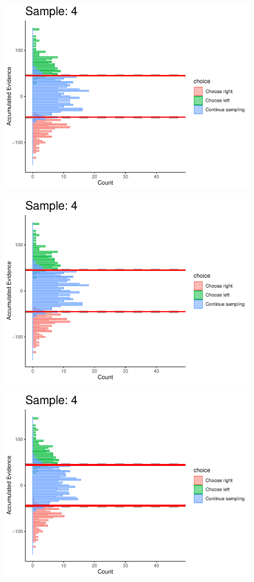 \documentclass[
]{book}
\begin{document}
\begin{center}\includegraphics[width=0.8\linewidth]{LateNightBayes_files/figure-latex/collapsing_dcb-35} \end{center}

\begin{center}\includegraphics[width=0.8\linewidth]{LateNightBayes_files/figure-latex/collapsing_dcb-36} \end{center}

\begin{center}\includegraphics[width=0.8\linewidth]{LateNightBayes_files/figure-latex/collapsing_dcb-37} \end{center}
\end{document}

